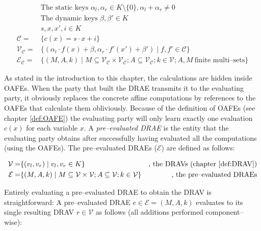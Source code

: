 \begin{align}
%
  &\text{The static keys } \alpha_l, \alpha_r \in K \setminus \{0\}, \alpha_l +
  \alpha_r \neq 0\nonumber\\
%
  &\text{The dynamic keys } \beta, \beta' \in K \nonumber\\
%
  &s, x, x', i \in K \nonumber\\
%
  \mathcal{C} = & \{ c(x) = s \cdot x + i \} \nonumber\\
%
  \mathcal{V}_\mathcal{C} = & \{ (\alpha_l \cdot f(x) + \beta,
                      \alpha_r \cdot f'(x') + \beta' )
                    \mid f, f' \in \mathcal{C} \} \nonumber\\
%
  \label{rel:DRAE}
  \mathcal{E}_\mathcal{C} = & \{ (M, A, k) \mid
      M \subseteq \mathcal{V}_\mathcal{C} \times
      \mathcal{V}_\mathcal{C}; A \subseteq \mathcal{V}_\mathcal{C};
      k \in \mathcal{V};
      A, M~\text{finite multi--sets} \}
%
\end{align}

As stated in the introduction to this chapter, the calculations are hidden
inside OAFEs. When the party that built the DRAE transmits it to the evaluating
party, it obviously replaces the concrete affine computations by references to
the OAFEs that calculate them obliviously.  Because of the definition of OAFEs
(see chapter \ref{def:OAFE}) the evaluating party will only learn exactly one
evaluation $c(x)$ for each variable $x$. A \emph{pre--evaluated DRAE} is the
entity that the evaluating party obtains after successfully having evaluated all
the computations (using the OAFEs). The pre--evaluated DRAEs ($\mathcal{E}$) are
defined as follows:

\begin{align}
  \mathcal{V} = & \{ (v_l, v_r) \mid v_l, v_r \in K \}
  &\text{, the DRAVs (chapter \ref{def:DRAV})} \nonumber\\
%
  \label{rel:pre-eval-DRAE}
  \mathcal{E} = & \{ (M, A, k) \mid
      M \subseteq \mathcal{V} \times \mathcal{V};
      A \subseteq \mathcal{V};
      k \in \mathcal{V} \}
      &\text{, the pre--evaluated DRAEs}
\end{align}


\label{sec:DRAE-decoding}

Entirely evaluating a pre--evaluated DRAE to obtain the DRAV is straightforward:
A pre--evaluated DRAE $e \in \mathcal{E} = (M,A, k)$ evaluates to its
single resulting DRAV $r \in \mathcal{V}$ as follows (all additions performed
component--wise):

